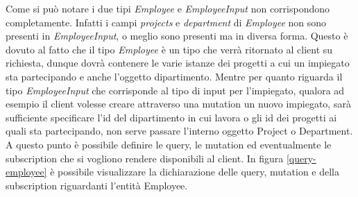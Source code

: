 \FloatBarrier
Come si può notare i due tipi \textit{Employee} e \textit{EmployeeInput} non corrispondono completamente. Infatti i campi \textit{projects} e \textit{department} di \textit{Employee} non sono presenti in \textit{EmployeeInput}, o  meglio sono presenti ma in diversa forma. Questo è dovuto al fatto che il tipo \textit{Employee} è un tipo che verrà ritornato al client su richiesta, dunque dovrà contenere le varie istanze dei progetti a cui un impiegato sta partecipando e anche l'oggetto dipartimento. Mentre per quanto riguarda il tipo \textit{EmployeeInput} che corrisponde al tipo di input per l'impiegato, qualora ad esempio il client volesse creare attraverso una mutation un nuovo impiegato, sarà sufficiente specificare l'id del dipartimento in cui lavora o gli id dei progetti ai quali sta partecipando, non serve passare l'interno oggetto Project o Department.\\
A questo punto è possibile definire le query, le mutation ed eventualmente le subscription che si vogliono rendere disponibili al client. In figura \ref{query-employee} è possibile visualizzare la dichiarazione delle query, mutation e della subscription riguardanti l'entità Employee.
